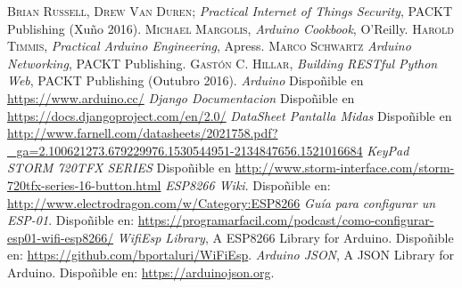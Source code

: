 \documentclass[11pt,twoside]{book}
\begin{document}
\begin{thebibliography}{99}

 \textsc{Brian Russell, Drew Van Duren}; \emph{Practical Internet of Things Security}, PACKT Publishing (Xuño 2016).
 \textsc{Michael Margolis}, \emph{Arduino Cookbook}, O'Reilly.
 \textsc{Harold Timmis}, \emph{Practical Arduino Engineering}, Apress.
 \textsc{Marco Schwartz} \emph{Arduino Networking}, PACKT Publishing.
 \textsc{Gastón C. Hillar}, \emph{Building RESTful Python Web}, PACKT Publishing (Outubro 2016).
 \textit{Arduino} Dispoñible en \url{https://www.arduino.cc/}
\textit{Django Documentacion} Dispoñible en \url{https://docs.djangoproject.com/en/2.0/}
 \textit{DataSheet Pantalla Midas} Dispoñible en \url{http://www.farnell.com/datasheets/2021758.pdf?_ga=2.100621273.679229976.1530544951-2134847656.1521016684}
 \textit{KeyPad STORM 720TFX SERIES} Dispoñible en \url{http://www.storm-interface.com/storm-720tfx-series-16-button.html}
 \textit{ESP8266 Wiki}. Dispoñible en: \url{http://www.electrodragon.com/w/Category:ESP8266}
 \textit{Guía para configurar un ESP-01}. Dispoñible en: \url{https://programarfacil.com/podcast/como-configurar-esp01-wifi-esp8266/} 
 \textit{WifiEsp Library}, A ESP8266 Library for Arduino. Dispoñible en: \url{https://github.com/bportaluri/WiFiEsp}.
 \textit{Arduino JSON}, A JSON Library for Arduino. Dispoñible en: \url{https://arduinojson.org}.

					
\end{thebibliography}

\stopcontents[parts]

\cleardoublepage
\renewcommand{\documento}{ANEXOS}
\end{document}
